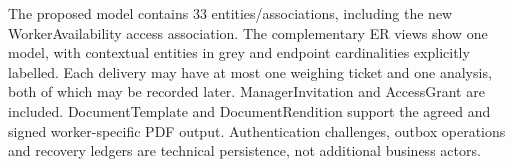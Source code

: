 The proposed model contains 33 entities/associations, including the new WorkerAvailability access association. The complementary ER views show one
model, with contextual entities in grey and endpoint cardinalities explicitly
labelled. Each delivery may have at most one weighing ticket and one analysis,
both of which may be recorded later. ManagerInvitation and AccessGrant
are included. DocumentTemplate and DocumentRendition support the agreed  and
signed worker-specific PDF output. Authentication challenges, outbox operations
and recovery ledgers are technical persistence, not additional business actors.

